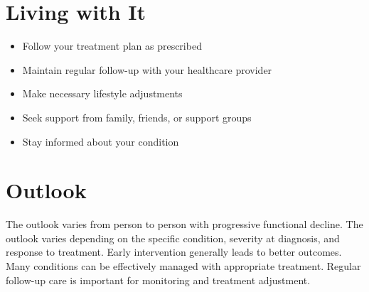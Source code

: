 \section{Living with It}
\begin{itemize}[noitemsep]
  \item Follow your treatment plan as prescribed
  \item Maintain regular follow-up with your healthcare provider
  \item Make necessary lifestyle adjustments
  \item Seek support from family, friends, or support groups
  \item Stay informed about your condition
\end{itemize}
\section{Outlook}
The outlook varies from person to person with progressive functional decline. The outlook varies depending on the specific condition, severity at diagnosis, and response to treatment. Early intervention generally leads to better outcomes. Many conditions can be effectively managed with appropriate treatment. Regular follow-up care is important for monitoring and treatment adjustment.

